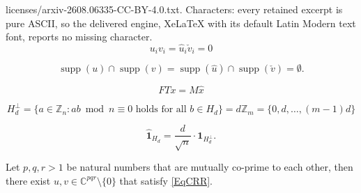 \documentclass[10pt,a4paper]{amsart}
\DeclareMathOperator{\supp}{supp}
\newcommand{\F}[1]{\widehat{\mathbf 1}_{#1}}
\begin{document}
licenses/arxiv-2608.06335-CC-BY-4.0.txt. Characters: every retained excerpt is pure ASCII, so the delivered engine, XeLaTeX with its default Latin Modern text font, reports no missing character.
\begin{equation} \label{EqCRR}
u_iv_i=\hat u_i\check v_{i}=0
\end{equation}

\begin{equation} \label{EqCRR2}
\supp(u)\cap\supp(v)=\supp(\hat u)\cap\supp(\check v)=\emptyset.
\end{equation}

\begin{equation} \label{EqTM}
FTx=M\hat x
\end{equation}

\begin{equation} \label{EqPerp}
H_d^{\perp}=\{a\in\mathbb Z_n: ab \bmod n\equiv 0 \text{ holds for all } b\in H_d\}=d\mathbb Z_m=\{0,d,\ldots,(m-1)d\}
\end{equation}

\begin{equation} \label{EqPoisson}
\F{H_d}=\frac{d}{\sqrt n}\cdot \mathbf 1_{H_d^{\perp}}. 
\end{equation}

\begin{Prop} \label{PropPQR}
Let $p,q,r>1$ be natural numbers that are mutually co-prime to each other, then there exist $u,v\in\mathbb C^{pqr}\setminus\{0\}$ that satisfy \eqref{EqCRR}.
\end{Prop}
\end{document}
